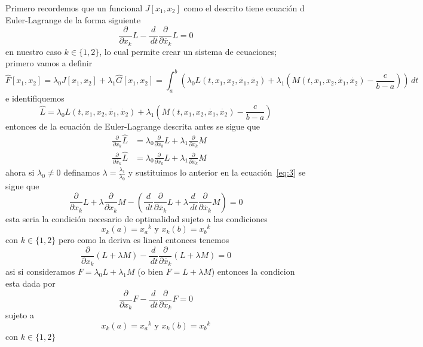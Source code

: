 \documentclass{ejercicios}
\begin{document}
\begin{solution}
  Primero recordemos que un funcional $J[x_1,x_2]$ como el descrito tiene ecuación d Euler-Lagrange de la forma siguiente 
  \begin{equation}\label{eq:3}
  \frac{\partial}{\partial x_k}L - \frac{d}{\,dt}\frac{\partial}{\partial\dot{x_k}}L = 0
  \end{equation}
  en nuestro caso $k\in\{1,2\}$, lo cual permite crear un sistema de ecuaciones; primero vamos a definir 
  \begin{equation}
    \hat{F}[x_1,x_2] = \lambda_0J[x_1,x_2] + \lambda_1\hat{G}[x_1,x_2] = \int_{a}^{b} \left(\lambda_0L(t,x_1,x_2,\dot{x_1},\dot{x_2}) + \lambda_1\left(M(t,x_1,x_2,\dot{x_1},\dot{x_2}) - \frac{c}{b-a}\right)\right)\,dt
  \end{equation}
  e identifiquemos 
  \begin{equation}
    \hat{L} = \lambda_0L(t,x_1,x_2,\dot{x_1},\dot{x_2}) + \lambda_1\left(M(t,x_1,x_2,\dot{x_1},\dot{x_2}) - \frac{c}{b-a}\right)
  \end{equation}
  entonces de la ecuación de Euler-Lagrange descrita antes se sigue que 
  \[
  \begin{aligned}
    & \frac{\partial}{\partial x_k}\hat{L} &= \lambda_0\frac{\partial}{\partial x_k}L + \lambda_1\frac{\partial}{\partial x_k}M \\ 
    & \frac{\partial}{\partial\dot{x_k}}\hat{L} &= \lambda_0\frac{\partial}{\partial\dot{x_k}}L + \lambda_1\frac{\partial}{\partial\dot{x_k}}M
  \end{aligned}
  \]
  ahora si $\lambda_0\neq 0$ definamos $\lambda = \frac{\lambda_1}{\lambda_0}$ y sustituimos lo anterior en la ecuación~\ref{eq:3} se sigue que
  \[
    \frac{\partial}{\partial x_k}L + \lambda\frac{\partial}{\partial x_k}M - \left(\frac{d}{\,dt}\frac{\partial}{\partial\dot{x_k}}L + \lambda\frac{d}{\,dt}\frac{\partial}{\partial\dot{x_k}}M\right) = 0
  \]
  esta seria la condición necesario de optimalidad sujeto a las condiciones 
  \[x_k(a) = {x_a}^k \text{ y } x_k(b) = {x_b}^{k}\]
  con $k\in\{1,2\}$ pero como la deriva es lineal entonces tenemos 
  \begin{equation}\label{eq:6}
    \frac{\partial}{\partial x_k}\left( L + \lambda M\right) - \frac{d}{\,dt}\frac{\partial}{\partial\dot{x_k}}\left( L + \lambda M\right) = 0
  \end{equation}
  asi si consideramos $F = \lambda_0 L + \lambda_1 M$ (o bien $F = L + \lambda M$) entonces la condicion esta dada por 
  \begin{equation}\label{eq:7}
    \frac{\partial}{\partial x_k}F - \frac{d}{\,dt}\frac{\partial}{\partial\dot{x_k}}F = 0 
  \end{equation}
  sujeto a 
  \[x_k(a) = {x_a}^k \text{ y } x_k(b) = {x_b}^{k}\]
  con $k\in\{1,2\}$ 
\end{solution}
\end{document}
